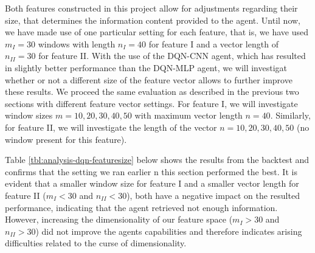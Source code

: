 Both features constructed in this project allow for adjustments regarding their size, that determines the information content provided to the agent.
Until now, we have made use of one particular setting for each feature, that is, we have used $m_I=30$ windows with length $n_I=40$ for feature I and a vector length of $n_{II}=30$ for feature II.
With the use of the DQN-CNN agent, which has resulted in slightly better performance than the DQN-MLP agent, we will investigat whether or not a different size of the feature vector allows to further improve these results.
We proceed the same evaluation as described in the previous two sections with different feature vector settings.
For feature I, we will investigate window sizes $m=10,20,30,40,50$ with maximum vector length $n=40$.
Similarly, for feature II, we will investigate the length of the vector $n=10,20,30,40,50$ (no window present for this feature).

Table \ref{tbl:analysis-dqn-featuresize} below shows the results from the backtest and confirms that the setting we ran earlier n this section performed the best.
It is evident that a smaller window size for feature I and a smaller vector length for feature II ($m_I<30$ and $n_{II}<30$), both have a negative impact on the resulted performance, indicating that the agent retrieved not enough information.
However, increasing the dimensionality of our feature space ($m_I>30$ and $n_{II}>30$) did not improve the agents capabilities and therefore indicates arising difficulties related to the curse of dimensionality\cite{keogh2011curse}.

